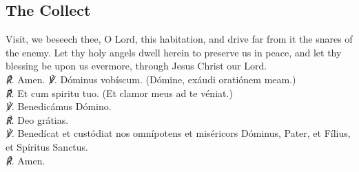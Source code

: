 \subsection{The Collect}
Visit, we beseech thee, O Lord, this habitation, and drive far from it the snares of the enemy. Let thy holy angels dwell herein to preserve us in peace, and let thy blessing be upon us evermore, through Jesus Christ our Lord.\\
\textit{\scshape ℟.} Amen.
{
	\textit{\scshape ℣.} Dóminus vobíscum. (Dómine, exáudi oratiónem meam.)\\
	\textit{\scshape ℟.} Et cum spiritu tuo. (Et clamor meus ad te véniat.)\\
	\textit{\scshape ℣.} Benedicámus Dómino.\\
	\textit{\scshape ℟.} Deo grátias.\\
	\textit{\scshape ℣.} Benedícat et custódiat nos omnípotens et miséricors Dóminus, {} Pater, et Fílius, et Spíritus Sanctus.\\
	\textit{\scshape ℟.} Amen.
}
